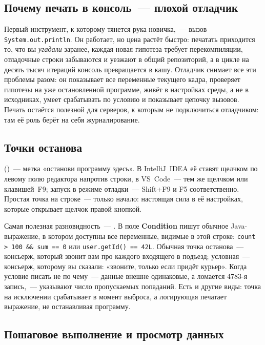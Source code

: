\subsection{Почему печать в консоль~--- плохой отладчик}

Первый инструмент, к которому тянется рука новичка,~--- вызов
\texttt{System.out.println}. Он работает, но цена растёт быстро: печатать
приходится то, что вы \emph{угадали} заранее, каждая новая гипотеза требует
перекомпиляции, отладочные строки забываются и уезжают в общий репозиторий, а в
цикле на десять тысяч итераций консоль превращается в кашу. Отладчик снимает
все эти проблемы разом: он показывает все переменные текущего кадра, проверяет
гипотезы на уже остановленной программе, живёт в настройках среды, а не в
исходниках, умеет срабатывать по условию и показывает цепочку вызовов. Печать
остаётся полезной для серверов, к которым не подключиться отладчиком: там её
роль берёт на себя журналирование.

\subsection{Точки останова}

 ()~--- метка «останови программу здесь».
В IntelliJ~IDEA её ставят щелчком по левому полю редактора напротив строки, в
VS~Code~--- тем же щелчком или клавишей~F9; запуск в режиме отладки~---
Shift+F9 и F5 соответственно. Простая точка на строке~--- только начало:
настоящая сила в её настройках, которые открывает щелчок правой кнопкой.

Самая полезная разновидность~--- . В поле
\textbf{Condition} пишут обычное Java-выражение, в котором доступны все
переменные, видимые в этой строке: \texttt{count > 100 \&\& sum == 0} или
\texttt{user.getId() == 42L}. Обычная точка останова~--- консьерж, который
звонит вам про каждого входящего в подъезд; условная~--- консьерж, которому вы
сказали: «звоните, только если придёт курьер». Когда условие писать не по
чему~--- данные внешне одинаковые, а ломается 4783-я запись,~--- указывают
число пропускаемых попаданий. Есть и другие виды: точка на исключении
срабатывает в момент выброса, а логирующая печатает выражение, не останавливая
программу.

\subsection{Пошаговое выполнение и просмотр данных}

